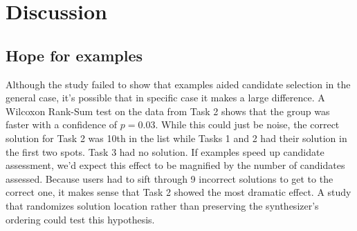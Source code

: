 \section{Discussion}
\label{sec:discussion}

\subsection{Hope for examples}
Although the study failed to show that examples aided candidate selection in
the general case, it's possible that in specific case it makes a large difference.
%
A Wilcoxon Rank-Sum test on the data from Task 2 shows that the \example
group was faster with a confidence of $p=0.03$.
%
While this could just be noise, the correct solution for Task 2 was 10th in
the list while Tasks 1 and 2 had their solution in the first two spots.
%
Task 3 had no solution.
%
If examples speed up candidate assessment, we'd expect this effect to be
magnified by the number of candidates assessed.
%
Because users had to sift through 9 incorrect solutions to get to the correct
one, it makes sense that Task 2 showed the most dramatic effect.
%
A study that randomizes solution location rather than preserving the synthesizer's ordering
could test this hypothesis.